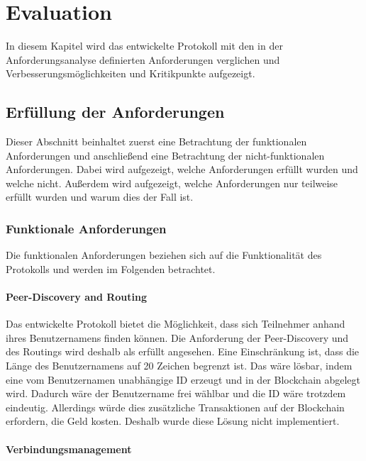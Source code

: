 \chapter{Evaluation}
\label{chap:evaluation}

In diesem Kapitel wird das entwickelte Protokoll mit den in der Anforderungsanalyse definierten Anforderungen verglichen und Verbesserungsmöglichkeiten und Kritikpunkte aufgezeigt.


\section{Erfüllung der Anforderungen}
\label{sec:erfuellung_der_anforderungen}

Dieser Abschnitt beinhaltet zuerst eine Betrachtung der funktionalen Anforderungen und anschließend eine Betrachtung der nicht-funktionalen Anforderungen. Dabei wird aufgezeigt, welche Anforderungen erfüllt wurden und welche nicht. Außerdem wird aufgezeigt, welche Anforderungen nur teilweise erfüllt wurden und warum dies der Fall ist.  


\subsection{Funktionale Anforderungen}
\label{subsec:funktionale_anforderungen}

Die funktionalen Anforderungen beziehen sich auf die Funktionalität des Protokolls und werden im Folgenden betrachtet.

\subsubsection{Peer-Discovery and Routing}

Das entwickelte Protokoll bietet die Möglichkeit, dass sich Teilnehmer anhand ihres Benutzernamens finden können. Die Anforderung der Peer-Discovery und des Routings wird deshalb als erfüllt angesehen. Eine Einschränkung ist, dass die Länge des Benutzernamens auf 20 Zeichen begrenzt ist. Das wäre lösbar, indem eine vom Benutzernamen unabhängige ID erzeugt und in der Blockchain abgelegt wird. Dadurch wäre der Benutzername frei wählbar und die ID wäre trotzdem eindeutig. Allerdings würde dies zusätzliche Transaktionen auf der Blockchain erfordern, die Geld kosten. Deshalb wurde diese Lösung nicht implementiert.


\subsubsection{Verbindungsmanagement}


